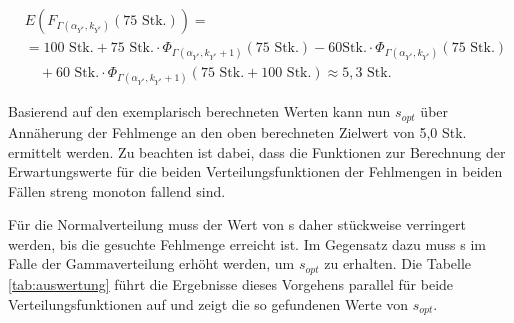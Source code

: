 \begin{align*}
&E\left(F_{\Gamma\left(\alpha_{Y^*},k_{Y^*}\right)}(75 \text{ Stk.})\right)= \\
&= 100\text{ Stk.}+75\text{ Stk.} \cdot \Phi_{\Gamma\left(\alpha_{Y^*},k_{Y^*}+1\right)}\left(75\text{ Stk.}\right)- 60\text{Stk.} \cdot \Phi_{\Gamma\left(\alpha_{Y^*},k_{Y^*}\right)}\left(75\text{ Stk.}\right) \\
&\quad + 60\text{ Stk.} \cdot \Phi_{\Gamma\left(\alpha_{Y^*},k_{Y^*}+1\right)}\left(75\text{ Stk.}+100\text{ Stk.}\right) \approx 5,3\text{ Stk.}
\end{align*}

Basierend auf den exemplarisch berechneten Werten kann nun \(s_{opt}\) über Annäherung der Fehlmenge an den oben berechneten Zielwert von 5,0 Stk. ermittelt werden. Zu beachten ist dabei, dass die Funktionen zur Berechnung der Erwartungswerte für die beiden Verteilungsfunktionen der Fehlmengen in beiden Fällen streng monoton fallend sind.

Für die Normalverteilung muss der Wert von s daher stückweise verringert werden, bis die gesuchte Fehlmenge erreicht ist. Im Gegensatz dazu muss s im Falle der Gammaverteilung erhöht werden, um \(s_{opt}\) zu erhalten. Die Tabelle \ref{tab:auswertung} führt die Ergebnisse dieses Vorgehens parallel für beide Verteilungsfunktionen auf und zeigt die so gefundenen Werte von \(s_{opt}\).